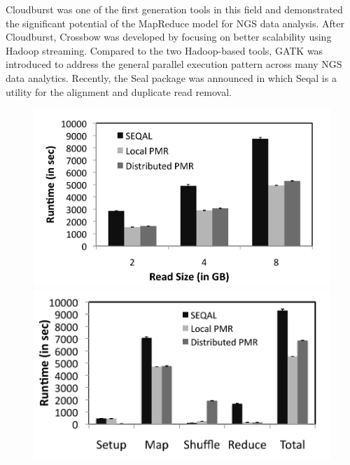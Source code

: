 \documentclass{acm_proc_article-sp}
\begin{document}
Cloudburst was one of the first generation tools in this field and
demonstrated the significant potential of the MapReduce model for NGS
data analysis.  After Cloudburst, Crossbow was developed by focusing
on better scalability using Hadoop streaming.  Compared to the two
Hadoop-based tools, GATK was introduced to address the general
parallel execution pattern across many NGS data analytics.  Recently,
the Seal package was announced in which Seqal is a utility for the
alignment and duplicate read removal.


\begin{figure}
 \centering
\includegraphics[scale=0.50]{figures/seqalvslocalpmr-bw.pdf}
\includegraphics[scale=0.52]{figures/8GB_phasewisetimes-bw.pdf}



\end{figure}
\end{document}
